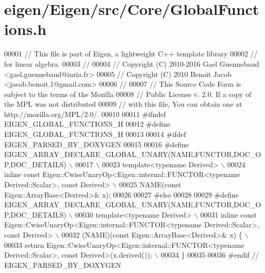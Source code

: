\hypertarget{eigen_2_eigen_2src_2_core_2_global_functions_8h_source}{}\section{eigen/\+Eigen/src/\+Core/\+Global\+Functions.h}
\label{eigen_2_eigen_2src_2_core_2_global_functions_8h_source}

\begin{DoxyCode}
00001 \textcolor{comment}{// This file is part of Eigen, a lightweight C++ template library}
00002 \textcolor{comment}{// for linear algebra.}
00003 \textcolor{comment}{//}
00004 \textcolor{comment}{// Copyright (C) 2010-2016 Gael Guennebaud <gael.guennebaud@inria.fr>}
00005 \textcolor{comment}{// Copyright (C) 2010 Benoit Jacob <jacob.benoit.1@gmail.com>}
00006 \textcolor{comment}{//}
00007 \textcolor{comment}{// This Source Code Form is subject to the terms of the Mozilla}
00008 \textcolor{comment}{// Public License v. 2.0. If a copy of the MPL was not distributed}
00009 \textcolor{comment}{// with this file, You can obtain one at http://mozilla.org/MPL/2.0/.}
00010 
00011 \textcolor{preprocessor}{#ifndef EIGEN\_GLOBAL\_FUNCTIONS\_H}
00012 \textcolor{preprocessor}{#define EIGEN\_GLOBAL\_FUNCTIONS\_H}
00013 
00014 \textcolor{preprocessor}{#ifdef EIGEN\_PARSED\_BY\_DOXYGEN}
00015 
00016 \textcolor{preprocessor}{#define EIGEN\_ARRAY\_DECLARE\_GLOBAL\_UNARY(NAME,FUNCTOR,DOC\_OP,DOC\_DETAILS) \(\backslash\)}
00017 \textcolor{preprocessor}{ \(\backslash\)}
00023 \textcolor{preprocessor}{  template<typename Derived> \(\backslash\)}
00024 \textcolor{preprocessor}{  inline const Eigen::CwiseUnaryOp<Eigen::internal::FUNCTOR<typename Derived::Scalar>, const Derived> \(\backslash\)}
00025 \textcolor{preprocessor}{  NAME(const Eigen::ArrayBase<Derived>& x);}
00026 
00027 \textcolor{preprocessor}{#else}
00028 
00029 \textcolor{preprocessor}{#define EIGEN\_ARRAY\_DECLARE\_GLOBAL\_UNARY(NAME,FUNCTOR,DOC\_OP,DOC\_DETAILS) \(\backslash\)}
00030 \textcolor{preprocessor}{  template<typename Derived> \(\backslash\)}
00031 \textcolor{preprocessor}{  inline const Eigen::CwiseUnaryOp<Eigen::internal::FUNCTOR<typename Derived::Scalar>, const Derived> \(\backslash\)}
00032 \textcolor{preprocessor}{  (NAME)(const Eigen::ArrayBase<Derived>& x) \{ \(\backslash\)}
00033 \textcolor{preprocessor}{    return Eigen::CwiseUnaryOp<Eigen::internal::FUNCTOR<typename Derived::Scalar>, const
       Derived>(x.derived()); \(\backslash\)}
00034 \textcolor{preprocessor}{  \}}
00035 
00036 \textcolor{preprocessor}{#endif // EIGEN\_PARSED\_BY\_DOXYGEN}

\end{DoxyCode}
